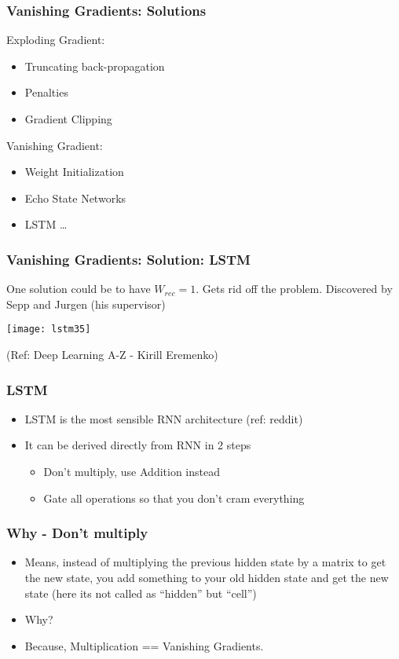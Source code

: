 \begin{frame}[fragile] \frametitle{Vanishing Gradients: Solutions}
Exploding Gradient:
\begin{itemize}
\item Truncating back-propagation
\item Penalties
\item Gradient Clipping
\end{itemize}
Vanishing Gradient:
\begin{itemize}
\item Weight Initialization
\item Echo State Networks
\item LSTM \ldots
\end{itemize}

\end{frame}




\begin{frame}[fragile] \frametitle{Vanishing Gradients: Solution: LSTM}
One solution could be to have  $W_{rec} = 1$. Gets rid off the problem.
Discovered by Sepp and Jurgen (his supervisor)
\begin{center}
\texttt{[image: lstm35]}

\tiny{(Ref: Deep Learning A-Z - Kirill Eremenko)}
\end{center}

\end{frame}




\begin{frame}[fragile] \frametitle{LSTM}
\begin{itemize}
\item LSTM is the most sensible RNN architecture (ref: reddit)
\item It can be derived directly from RNN in 2 steps
\begin{itemize}
\item Don't multiply, use Addition instead
\item Gate all operations so that you don't cram everything
\end{itemize}
\end{itemize}
\end{frame}

\begin{frame}[fragile] \frametitle{Why - Don't multiply}
\begin{itemize}
\item Means, instead of multiplying the previous hidden state by a matrix to get the new state, you add something to your old hidden state and get the new state (here its not called as ``hidden'' but ``cell'')
\item Why?
\item Because, Multiplication == Vanishing Gradients.
\end{itemize}
\end{frame}

